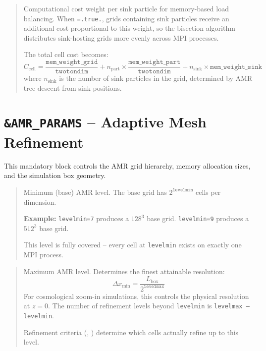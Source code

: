\begin{quote}
Computational cost weight per sink particle for memory-based load
balancing.  When \texttt{=.true.}, grids
containing sink particles receive an additional cost proportional to
this weight, so the bisection algorithm distributes sink-hosting grids
more evenly across MPI processes.

The total cell cost becomes:
\[
  C_{\text{cell}} = \frac{\texttt{mem\_weight\_grid}}{\texttt{twotondim}}
                + n_{\text{part}} \times
                  \frac{\texttt{mem\_weight\_part}}{\texttt{twotondim}}
                + n_{\text{sink}} \times \texttt{mem\_weight\_sink}
\]
where $n_{\text{sink}}$ is the number of sink particles in the grid,
determined by AMR tree descent from sink positions.
\end{quote}


\section{\texttt{\&AMR\_PARAMS} -- Adaptive Mesh Refinement}
\label{sec:amr_params}

This mandatory block controls the AMR grid hierarchy, memory allocation
sizes, and the simulation box geometry.

\label{param:levelmin}

\begin{quote}
Minimum (base) AMR level.  The base grid has $2^{\texttt{levelmin}}$
cells per dimension.

\noindent\textcolor{apidefault}{\textsf{\textbf{Example:}}}
\texttt{levelmin=7} produces a $128^3$ base grid.
\texttt{levelmin=9} produces a $512^3$ base grid.

This level is fully covered -- every cell at \texttt{levelmin} exists
on exactly one MPI process.
\end{quote}

\label{param:levelmax}

\begin{quote}
Maximum AMR level.  Determines the finest attainable resolution:
\[
  \Delta x_{\min} = \frac{L_{\text{box}}}{2^{\texttt{levelmax}}}
\]
For cosmological zoom-in simulations, this controls the physical
resolution at $z=0$.  The number of refinement levels beyond
\texttt{levelmin} is \texttt{levelmax\,--\,levelmin}.

Refinement criteria (, )
determine which cells actually refine up to this level.
\end{quote}

